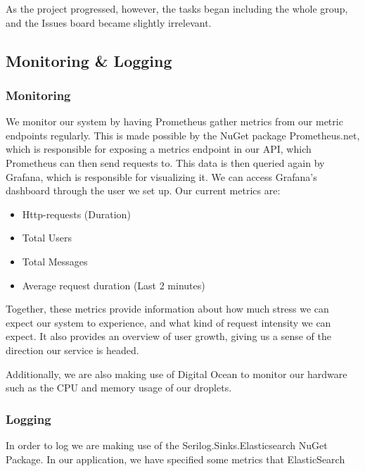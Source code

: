 \noindent As the project progressed, however, the tasks began including the whole group, and the Issues board became slightly irrelevant.

\subsection{Monitoring \& Logging}

\subsubsection{Monitoring} \label{Monitoring}

We monitor our system by having Prometheus gather metrics from our metric endpoints regularly. This is made possible by the NuGet package Prometheus.net, which is responsible for exposing a metrics endpoint in our API, which Prometheus can then send requests to. This data is then queried again by Grafana, which is responsible for visualizing it. We can access Grafana's dashboard through the user we set up. Our current metrics are:

\begin{itemize}
    \item Http-requests (Duration)
    \item Total Users
    \item Total Messages
    \item Average request duration (Last 2 minutes)
\end{itemize}

\noindent Together, these metrics provide information about how much stress we can expect our system to experience, and what kind of request intensity we can expect. It also provides an overview of user growth, giving us a sense of the direction our service is headed. 

Additionally, we are also making use of Digital Ocean to monitor our hardware such as the CPU and memory usage of our droplets.

\subsubsection{Logging} \label{Logging}

In order to log we are making use of the Serilog.Sinks.Elasticsearch NuGet Package. In our application, we have specified some metrics that ElasticSearch 

